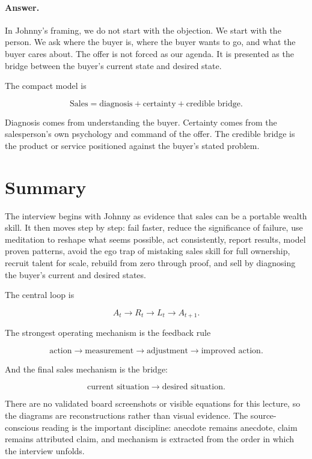 \paragraph{Answer.}
In Johnny's framing, we do not start with the objection. We start with the person. We ask where the buyer is, where the buyer wants to go, and what the buyer cares about. The offer is not forced as our agenda. It is presented as the bridge between the buyer's current state and desired state.

The compact model is

\begin{equation}
\text{Sales}
=
\text{diagnosis}
+
\text{certainty}
+
\text{credible bridge}.
\end{equation}

Diagnosis comes from understanding the buyer. Certainty comes from the salesperson's own psychology and command of the offer. The credible bridge is the product or service positioned against the buyer's stated problem.

\section{Summary}

The interview begins with Johnny as evidence that sales can be a portable wealth skill. It then moves step by step: fail faster, reduce the significance of failure, use meditation to reshape what seems possible, act consistently, report results, model proven patterns, avoid the ego trap of mistaking sales skill for full ownership, recruit talent for scale, rebuild from zero through proof, and sell by diagnosing the buyer's current and desired states.

The central loop is

\begin{equation}
A_t \longrightarrow R_t \longrightarrow L_t \longrightarrow A_{t+1}.
\end{equation}

The strongest operating mechanism is the feedback rule

\begin{equation}
\text{action}
\longrightarrow
\text{measurement}
\longrightarrow
\text{adjustment}
\longrightarrow
\text{improved action}.
\end{equation}

And the final sales mechanism is the bridge:

\begin{equation}
\text{current situation}
\longrightarrow
\text{desired situation}.
\end{equation}

There are no validated board screenshots or visible equations for this lecture, so the diagrams are reconstructions rather than visual evidence. The source-conscious reading is the important discipline: anecdote remains anecdote, claim remains attributed claim, and mechanism is extracted from the order in which the interview unfolds.